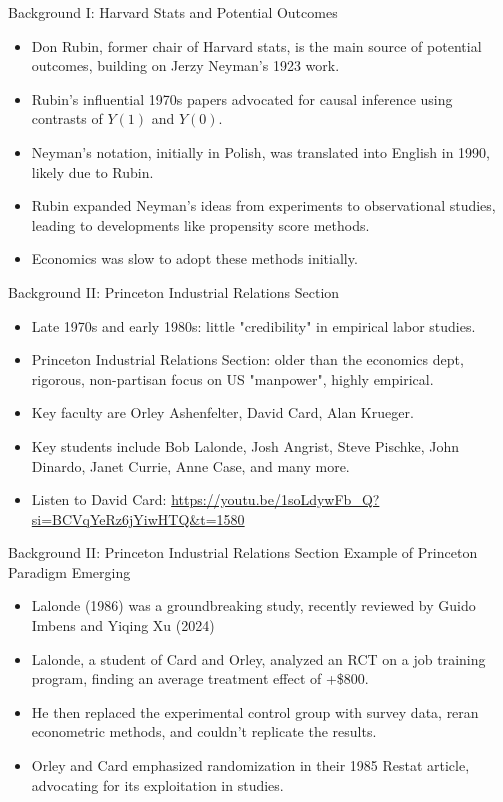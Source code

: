\documentclass{beamer}
\begin{document}
\begin{frame}{Background I: Harvard Stats and Potential Outcomes}
  \begin{itemize}
    \item Don Rubin, former chair of Harvard stats, is the main source of potential outcomes, building on Jerzy Neyman's 1923 work.
    \item Rubin's influential 1970s papers advocated for causal inference using contrasts of $Y(1)$ and $Y(0)$.
    \item Neyman's notation, initially in Polish, was translated into English in 1990, likely due to Rubin.
    \item Rubin expanded Neyman's ideas from experiments to observational studies, leading to developments like propensity score methods.
    \item Economics was slow to adopt these methods initially.
  \end{itemize}
\end{frame}


\begin{frame}{Background II: Princeton Industrial Relations Section}
  \begin{itemize}
    \item Late 1970s and early 1980s: little "credibility" in empirical labor studies.
    \item Princeton Industrial Relations Section: older than the economics dept, rigorous, non-partisan focus on US "manpower", highly empirical.
    \item Key faculty are Orley Ashenfelter, David Card, Alan Krueger.
    \item Key students include Bob Lalonde, Josh Angrist, Steve Pischke, John Dinardo, Janet Currie, Anne Case, and many more.
    \item Listen to David Card: \url{https://youtu.be/1soLdywFb_Q?si=BCVqYeRz6jYiwHTQ&t=1580}
  \end{itemize}
\end{frame}


\begin{frame}{Background II: Princeton Industrial Relations Section}
Example of Princeton Paradigm Emerging
  \begin{itemize}
    \item Lalonde (1986) was a groundbreaking study, recently reviewed by Guido Imbens and Yiqing Xu (2024)
    \item Lalonde, a student of Card and Orley, analyzed an RCT on a job training program, finding an average treatment effect of +\$800.
    \item He then replaced the experimental control group with survey data, reran econometric methods, and couldn't replicate the results.
    \item Orley and Card emphasized randomization in their 1985 Restat article, advocating for its exploitation in studies.
  \end{itemize}
\end{frame}
\end{document}
